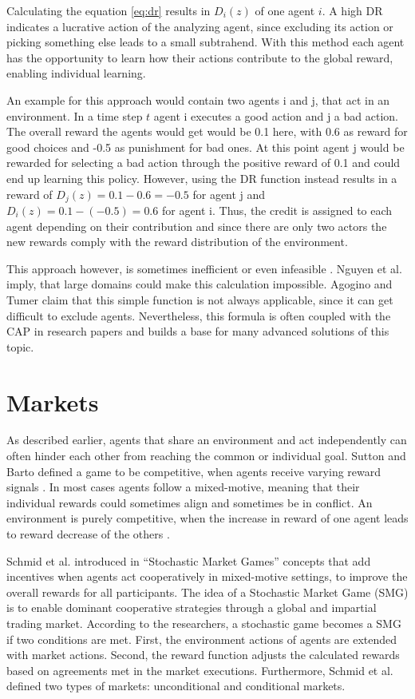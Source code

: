 Calculating the equation \eqref{eq:dr} results in $D_i(z)$ of one agent $i$. A high DR indicates a lucrative action of the analyzing agent, since excluding its action or picking something else leads to a small subtrahend. With this method each agent has the opportunity to learn how their actions contribute to the global reward, enabling individual learning. 

An example for this approach would contain two agents i and j, that act in an environment. In a time step $t$ agent i executes a good action and j a bad action. The overall reward the agents would get would be 0.1 here, with 0.6 as reward for good choices and -0.5 as punishment for bad ones. At this point agent j would be rewarded for selecting a bad action through the positive reward of 0.1 and could end up learning this policy. However, using the DR function instead results in a reward of $D_j(z) = 0.1 - 0.6 = -0.5$ for agent j and $D_i(z) = 0.1 - (-0.5) = 0.6$ for agent i. Thus, the credit is assigned to each agent depending on their contribution and since there are only two actors the new rewards comply with the reward distribution of the environment.

This approach however, is sometimes inefficient or even infeasible \cite{ngku18}. Nguyen et al. \cite{ngku18} imply, that large domains could make this calculation impossible. Agogino and Tumer \cite{agtu04} claim that this simple function is not always applicable, since it can get difficult to exclude agents. Nevertheless, this formula is often coupled with the CAP in research papers and builds a base for many advanced solutions of this topic.

\section{Markets}\label{market}
As described earlier, agents that share an environment and act independently can often hinder each other from reaching the common or individual goal. Sutton and Barto defined a game to be competitive, when agents receive varying reward signals \cite{suba18}. In most cases agents follow a mixed-motive, meaning that their individual rewards could sometimes align and sometimes be in conflict. An environment is purely competitive, when the increase in reward of one agent leads to reward decrease of the others \cite{scbe21}.

Schmid et al. introduced in ``Stochastic Market Games'' \cite{scbe21} concepts that add incentives when agents act cooperatively in mixed-motive settings, to improve the overall rewards for all participants. The idea of a Stochastic Market Game (SMG) is to enable dominant cooperative strategies through a global and impartial trading market. According to the researchers, a stochastic game becomes a SMG if two conditions are met. First, the environment actions of agents are extended with market actions. Second, the reward function adjusts the calculated rewards based on agreements met in the market executions. Furthermore, Schmid et al. defined two types of markets: unconditional and conditional markets.

